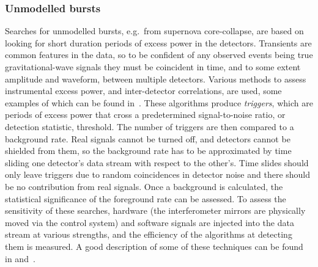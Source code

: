 \subsubsection{Unmodelled bursts}
\label{subsubsection:unmodelled} 

Searches for unmodelled bursts, e.g.\ from supernova core-collapse, are based on looking for short duration 
periods of excess power in the detectors. Transients are common features in the data, so to be confident of any observed events 
being true gravitational-wave signals they must be coincident in time, and to some extent amplitude and
waveform, between multiple detectors. Various methods to assess instrumental excess power, and inter-detector 
correlations, are used, some examples of which can be found in~\cite{Klimenko:2004, Anderson:2001, 
Searle:2008, McNabb:2004, Cadonati:2004, Chatterji:2004, Chatterji:2006, 2008CQGra..25k4029K, 
2010NJPh...12e3034S}. These algorithms produce \textit{triggers}, which are periods of excess power that 
cross a predetermined signal-to-noise ratio, or detection statistic, threshold. The number of triggers are 
then compared to a background rate. Real signals cannot be turned off, and detectors cannot be shielded from 
them, so the background rate has to be approximated by time sliding one detector's data stream with respect 
to the other's. Time slides should only leave triggers due to random coincidences in detector noise and there 
should be no contribution from real signals. Once a background is calculated, the statistical significance of the 
foreground rate can be assessed. To assess the sensitivity of these searches, hardware (the interferometer 
mirrors are physically moved via the control system) and software signals are injected into the data stream at
various strengths, and the efficiency of the algorithms at detecting them is measured. A good description of 
some of these techniques can be found in \cite{Abbott:2004b} and~\cite{Abbott:2006a}.

